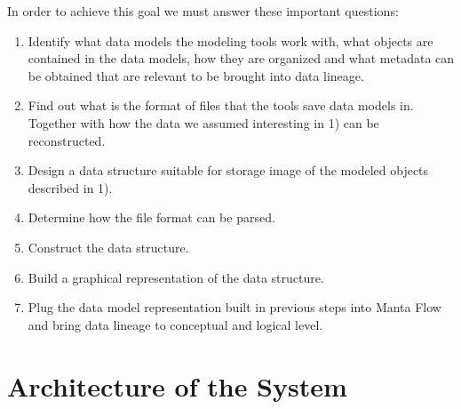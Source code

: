 In order to achieve this goal we must answer these important questions:
\begin{enumerate}
	\item Identify what data models the modeling tools work with, what objects are contained in the data models, how they are organized and what metadata can be obtained that are relevant to be brought into data lineage. 
	\item Find out what is the format of files that the tools save data models in. Together with how the data we assumed interesting in 1) can be reconstructed. 
	\item Design a data structure suitable for storage image of the modeled objects described in 1). 
	\item Determine how the file format can be parsed. 
	\item Construct the data structure. 
	\item Build a graphical representation of the data structure. 
	\item Plug the data model representation built in previous steps into Manta Flow and bring data lineage to conceptual and logical level. 
\end{enumerate}


\section{Architecture of the System}

